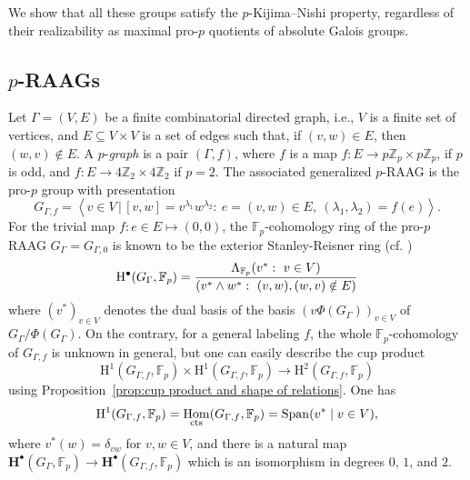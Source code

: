 \documentclass{amsart}
\theoremstyle{definition}
\theoremstyle{remark}
\DeclareMathOperator{\Hom}{Hom}
\newcommand{\FF}{\mathbb{F}}
\newcommand{\rmH}{\mathrm H}%
\newcommand{\bfH}{\mathbf{H}^\bullet}%
\newcommand{\pres}[2]{\left\langle{#1}\, \big\vert\, {#2}\right\rangle}
\begin{document}
We show that all these groups satisfy the $p$-Kijima--Nishi property, regardless of their realizability as maximal pro-$p$ quotients of absolute Galois groups. 

\subsection{\texorpdfstring{$p$}{}-RAAGs}\label{ssec:pRAAGs}
Let $\Gamma=(V,E)$ be a finite combinatorial directed graph, i.e., $V$ is a finite set of vertices, and $E\subseteq V\times V$ is a set of edges such that, if $(v,w)\in E$, then $(w,v)\notin E$.
A $p$-\textit{graph} is a pair $(\Gamma,f)$, where $f$ is a map $f:E\to p\mathbb Z_p\times p\mathbb Z_p$, if $p$ is odd, and $f:E\to 4\mathbb Z_2\times 4\mathbb Z_2$ if $p=2$. The associated generalized $p$-RAAG is the pro-$p$ group with presentation 
\[G_{\Gamma,f}=\pres{v\in V}{ [v,w]=v^{\lambda_1}w^{\lambda_2}:\ e=(v,w)\in E,\ (\lambda_1,\lambda_2)=f(e)}.\]
For the trivial map $f:e\in E\mapsto (0,0)$, the $\mathbb F_p$-cohomology ring of the pro-$p$ RAAG $G_\Gamma=G_{\Gamma,0}$ is known to be the exterior Stanley-Reisner ring (cf. \cite{lorensen,bartholdi})
\[{\rm H}^\bullet(G_\Gamma,\mathbb F_p)=\frac{\Lambda_{\mathbb F_p}(v^\ast:\ v\in V)}{(v^\ast\wedge w^\ast:\ (v,w),(w,v)\notin E)}\]
where $(v^\ast)_{v\in V}$ denotes the dual basis of the basis $(v\Phi(G_\Gamma))_{v\in V}$ of $G_\Gamma/\Phi(G_\Gamma)$.
On the contrary, for a general labeling $f$, the whole $\mathbb F_p$-cohomology of $G_{\Gamma,f}$ is unknown in general, but one can easily describe the cup product 
$$\rmH^1(G_{\Gamma,f},\mathbb F_p)\times \rmH^1(G_{\Gamma,f},\mathbb F_p)\longrightarrow \rmH^2(G_{\Gamma,f},\mathbb F_p)$$ using Proposition~\ref{prop:cup product and shape of relations}.
One has $$\rmH^1(G_{\Gamma,f},\FF_p)=\Hom_{\rm cts}(G_{\Gamma,f},\FF_p)={\rm Span}(v^\ast\mid v\in V),$$ where $v^\ast(w)=\delta_{vw}$ for $v,w\in V$, and there is a natural map $\bfH(G_\Gamma,\FF_p)\to \bfH(G_{\Gamma,f},\FF_p)$ which is an isomorphism in degrees $0$, $1$, and $2$.
\end{document}
